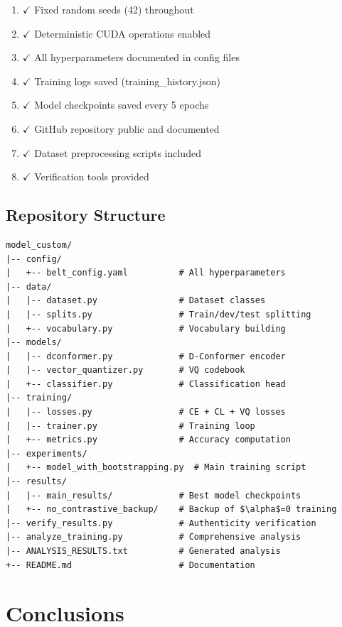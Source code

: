 \documentclass[12pt,a4paper]{article}
\begin{document}
\begin{enumerate}
    \item $\checkmark$ Fixed random seeds (42) throughout
    \item $\checkmark$ Deterministic CUDA operations enabled
    \item $\checkmark$ All hyperparameters documented in config files
    \item $\checkmark$ Training logs saved (training\_history.json)
    \item $\checkmark$ Model checkpoints saved every 5 epochs
    \item $\checkmark$ GitHub repository public and documented
    \item $\checkmark$ Dataset preprocessing scripts included
    \item $\checkmark$ Verification tools provided
\end{enumerate}

\subsection{Repository Structure}

\begin{lstlisting}[basicstyle=\ttfamily\footnotesize]
model_custom/
|-- config/
|   +-- belt_config.yaml          # All hyperparameters
|-- data/
|   |-- dataset.py                # Dataset classes
|   |-- splits.py                 # Train/dev/test splitting
|   +-- vocabulary.py             # Vocabulary building
|-- models/
|   |-- dconformer.py             # D-Conformer encoder
|   |-- vector_quantizer.py       # VQ codebook
|   +-- classifier.py             # Classification head
|-- training/
|   |-- losses.py                 # CE + CL + VQ losses
|   |-- trainer.py                # Training loop
|   +-- metrics.py                # Accuracy computation
|-- experiments/
|   +-- model_with_bootstrapping.py  # Main training script
|-- results/
|   |-- main_results/             # Best model checkpoints
|   +-- no_contrastive_backup/    # Backup of $\alpha$=0 training
|-- verify_results.py             # Authenticity verification
|-- analyze_training.py           # Comprehensive analysis
|-- ANALYSIS_RESULTS.txt          # Generated analysis
+-- README.md                     # Documentation
\end{lstlisting}

\section{Conclusions}
\end{document}
